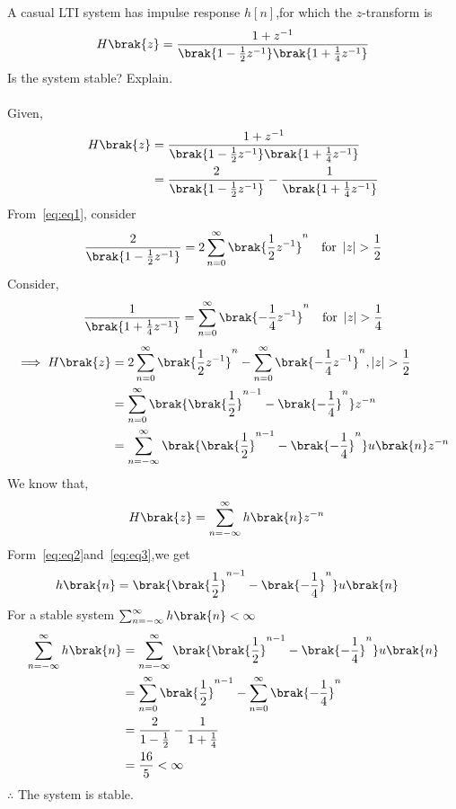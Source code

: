 \documentclass[journal,13pt,twocolumn]{IEEEtran}
\begin{document}
\text A casual LTI system has impulse response $h[n]$,for which the $z$-transform is 
\begin{align}
H\brak{z}=\frac{1+z^{-1}}{\brak{1-\frac{1}{2} z^{-1}}\brak{1+\frac{1}{4} z^{-1}}}
\end{align}
Is the system stable? Explain.\\
\solution \\
Given,
\begin{align}
H\brak{z}&=\frac{1+z^{-1}}{\brak{1-\frac{1}{2} z^{-1}}\brak{1+\frac{1}{4} z^{-1}}}\\
&=\frac{2}{\brak{1-\frac{1}{2} z^{-1}}}-\frac{1}{\brak{1+\frac{1}{4} z^{-1}}}\label{eq:eq1}
\end{align}
From~\eqref{eq:eq1}, consider
\begin{align}
\frac{2}{\brak{1-\frac{1}{2} z^{-1}}}&=2\sum_{n=0}^{\infty} \brak{\frac{1}{2} z^{-1}}^n  &\text{for }\left| z\right|>\frac{1}{2}
\end{align}
Consider,
\begin{align}
\frac{1}{\brak{1+\frac{1}{4} z^{-1}}}&=\sum_{n=0}^{\infty} \brak{-\frac{1}{4} z^{-1}}^n &\text{for }\left| z\right|>\frac{1}{4}
\end{align}
\begin{align}
\implies H\brak{z}&=2\sum_{n=0}^{\infty} \brak{\frac{1}{2} z^{-1}}^n-\sum_{n=0}^{\infty} \brak{-\frac{1}{4} z^{-1}}^n ,\left| z\right|>\frac{1}{2}\\
&=\sum_{n=0}^{\infty}\brak{\brak{\frac{1}{2}}^{n-1}-\brak{-\frac{1}{4}}^{n}}z^{-n}\\
&=\sum_{n=-\infty}^{\infty}\brak{\brak{\frac{1}{2}}^{n-1}-\brak{-\frac{1}{4}}^{n}}u\brak{n}z^{-n}\label{eq:eq2}
\end{align}
We know that,
\begin{align}
H\brak{z}&=\sum_{n=-\infty}^{\infty}h\brak{n}z^{-n}\label{eq:eq3}
\end{align}
Form~\eqref{eq:eq2}and~\eqref{eq:eq3},we get
\begin{align}
h\brak{n}&=\brak{\brak{\frac{1}{2}}^{n-1}-\brak{-\frac{1}{4}}^{n}}u\brak{n}
\end{align}
For a stable system $\sum_{n=-\infty}^{\infty}h\brak{n}<\infty$
\begin{align}
\sum_{n=-\infty}^{\infty}h\brak{n}&=\sum_{n=-\infty}^{\infty}\brak{\brak{\frac{1}{2}}^{n-1}-\brak{-\frac{1}{4}}^{n}}u\brak{n}\\
&=\sum_{n=0}^{\infty}\brak{\frac{1}{2}}^{n-1}-\sum_{n=0}^{\infty}\brak{-\frac{1}{4}}^{n}\\
&=\frac{2}{1-\frac{1}{2}}-\frac{1}{1+\frac{1}{4}}\\
&=\frac{16}{5}<\infty
\end{align}
$\therefore$ The system is stable.
\end{document}

